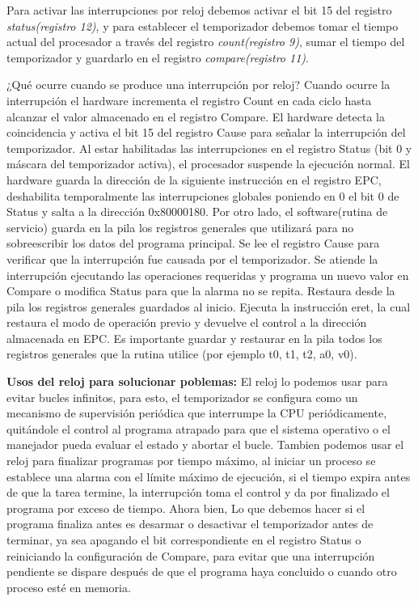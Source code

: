 \documentclass[12pt, a4paper]{article}
\begin{document}
Para activar las interrupciones por reloj debemos activar el bit 15 del registro \textit{status(registro 12)}, y para establecer el temporizador debemos tomar el tiempo actual del procesador a través del registro \textit{count(registro 9)}, sumar el tiempo del temporizador y guardarlo en el registro \textit{compare(registro 11)}.

¿Qué ocurre cuando se produce una interrupción por reloj? Cuando ocurre la interrupción el hardware incrementa el registro Count en cada ciclo hasta alcanzar el valor almacenado en el registro Compare. El hardware detecta la coincidencia y activa el bit 15 del registro Cause para señalar la interrupción del temporizador. Al estar habilitadas las interrupciones en el registro Status (bit 0 y máscara del temporizador activa), el procesador suspende la ejecución normal. El hardware guarda la dirección de la siguiente instrucción en el registro EPC, deshabilita temporalmente las interrupciones globales poniendo en 0 el bit 0 de Status y salta a la dirección 0x80000180. Por otro lado, el software(rutina de servicio) guarda en la pila los registros generales que utilizará para no sobreescribir los datos del programa principal. Se lee el registro Cause para verificar que la interrupción fue causada por el temporizador. Se atiende la interrupción ejecutando las operaciones requeridas y programa un nuevo valor en Compare o modifica Status para que la alarma no se repita. Restaura desde la pila los registros generales guardados al inicio. Ejecuta la instrucción eret, la cual restaura el modo de operación previo y devuelve el control a la dirección almacenada en EPC.  Es importante guardar y restaurar en la pila todos los registros generales que la rutina utilice (por ejemplo t0, t1, t2, a0, v0).

\textbf{Usos del reloj para solucionar poblemas:} El reloj lo podemos usar para evitar bucles infinitos, para esto, el temporizador se configura como un mecanismo de supervisión periódica que interrumpe la CPU periódicamente, quitándole el control al programa atrapado para que el sistema operativo o el manejador pueda evaluar el estado y abortar el bucle. Tambien podemos usar el reloj para finalizar programas por tiempo máximo, al iniciar un proceso se establece una alarma con el límite máximo de ejecución, si el tiempo expira antes de que la tarea termine, la interrupción toma el control y da por finalizado el programa por exceso de tiempo. Ahora bien, Lo que debemos hacer  si el programa finaliza antes es desarmar o desactivar el temporizador antes de terminar, ya sea apagando el bit correspondiente en el registro Status o reiniciando la configuración de Compare, para evitar que una interrupción pendiente se dispare después de que el programa haya concluido o cuando otro proceso esté en memoria.
\end{document}
